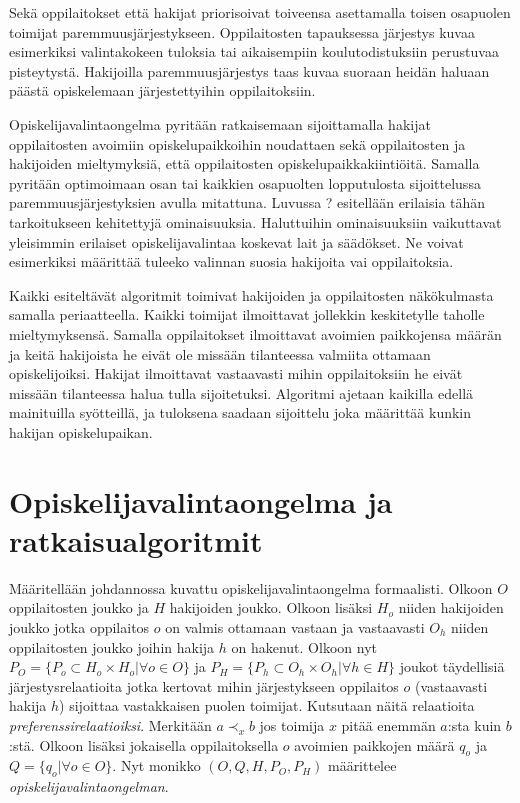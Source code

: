 \documentclass[gradu, twoside]{tktltiki}
\begin{document}
Sekä oppilaitokset että hakijat priorisoivat toiveensa asettamalla
toisen osapuolen toimijat paremmuusjärjestykseen. Oppilaitosten
tapauksessa järjestys kuvaa esimerkiksi valintakokeen tuloksia tai
aikaisempiin koulutodistuksiin perustuvaa pisteytystä. Hakijoilla
paremmuusjärjestys taas kuvaa suoraan heidän haluaan päästä
opiskelemaan järjestettyihin oppilaitoksiin.

Opiskelijavalintaongelma pyritään ratkaisemaan sijoittamalla hakijat
oppilaitosten avoimiin opiskelupaikkoihin noudattaen sekä oppilaitosten ja
hakijoiden mieltymyksiä, että oppilaitosten opiskelupaikkakiintiöitä.
Samalla pyritään optimoimaan osan tai kaikkien osapuolten lopputulosta
sijoittelussa paremmuusjärjestyksien avulla mitattuna. Luvussa ?
esitellään erilaisia tähän tarkoitukseen kehitettyjä ominaisuuksia.
Haluttuihin ominaisuuksiin vaikuttavat yleisimmin erilaiset
opiskelijavalintaa koskevat lait ja säädökset. Ne voivat esimerkiksi
määrittää tuleeko valinnan suosia hakijoita vai oppilaitoksia.

Kaikki esiteltävät algoritmit toimivat hakijoiden ja oppilaitosten
näkökulmasta samalla periaatteella. Kaikki toimijat ilmoittavat
jollekkin keskitetylle taholle mieltymyksensä. Samalla oppilaitokset
ilmoittavat avoimien paikkojensa määrän ja keitä hakijoista he eivät
ole missään tilanteessa valmiita ottamaan opiskelijoiksi. Hakijat
ilmoittavat vastaavasti mihin oppilaitoksiin he eivät missään
tilanteessa halua tulla sijoitetuksi. Algoritmi ajetaan kaikilla
edellä mainituilla syötteillä, ja tuloksena saadaan sijoittelu joka
määrittää kunkin hakijan opiskelupaikan.

\section{Opiskelijavalintaongelma ja ratkaisualgoritmit}

Määritellään johdannossa kuvattu opiskelijavalintaongelma formaalisti.
Olkoon $O$ oppilaitosten joukko ja $H$ hakijoiden joukko. Olkoon
lisäksi $H_o$ niiden hakijoiden joukko jotka oppilaitos $o$ on valmis
ottamaan vastaan ja vastaavasti $O_h$ niiden oppilaitosten joukko
joihin hakija $h$ on hakenut. Olkoon nyt $P_O = \{P_o \subset H_o
\times H_o | \forall o \in O\}$ ja $P_H = \{P_h \subset O_h \times O_h
| \forall h \in H\}$ joukot täydellisiä järjestysrelaatioita jotka
kertovat mihin järjestykseen oppilaitos $o$ (vastaavasti hakija $h$)
sijoittaa vastakkaisen puolen toimijat. Kutsutaan näitä relaatioita
\emph{preferenssirelaatioiksi}. Merkitään $a \prec_x b$ jos toimija
$x$ pitää enemmän $a$:sta kuin $b$:stä. Olkoon lisäksi jokaisella
oppilaitoksella $o$ avoimien paikkojen määrä $q_o$ ja $Q = \{q_o |
\forall o \in O\}$. Nyt monikko $(O, Q, H, P_O, P_H)$ määrittelee
\emph{opiskelijavalintaongelman}.
\end{document}
